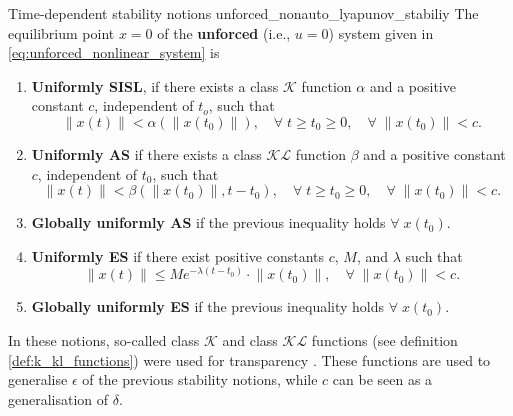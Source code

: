 \begin{definition}[list text=Time-dependent stability notions,after pre=\footnotetext{Definition 4.2 of \cite{khalilNonlinearControl2015} was slightly changed for consistency with earlier stability notions.}]{Time-dependent stability notions \cite{khalilNonlinearControl2015}\footnotemark}{unforced_nonauto_lyapunov_stabiliy}
  The equilibrium point $x = 0$ of the \textbf{unforced} (i.e., $u=0$) system given in \eqref{eq:unforced_nonlinear_system} is
  \begin{enumerate}
    \item \textbf{Uniformly SISL}, if there exists a class $\mathcal{K}$ function $\alpha$ and a positive constant $c$, independent of $t_o$, such that
          \begin{equation}
            \left\|x\left(t\right)\right\| < \alpha \left( \left\|x \left( t_0 \right) \right\|\right), \quad \forall \; t \geq t_0 \geq 0, \quad \forall \; \left\|x\left(t_0 \right) \right\| < c.
          \end{equation}
    \item \textbf{Uniformly AS} if there exists a class $\mathcal{KL}$ function $\beta$ and a positive constant $c$, independent of $t_0$, such that
          \begin{equation}
            \left\|x\left(t\right)\right\| < \beta \left( \left\|x \left( t_0 \right) \right\|, t-t_0\right), \quad \forall \; t \geq t_0 \geq 0, \quad \forall \; \left\|x\left(t_0 \right) \right\| < c.
          \end{equation}
    \item	\textbf{Globally uniformly AS} if the previous inequality holds $\forall \; x \left( t _ 0 \right)$.
    \item	\textbf{Uniformly ES} if there exist positive constants $c$, $M$, and $\lambda$ such that
          \begin{equation}
            \left\|x\left(t \right) \right\| \leq Me^{-\lambda\left(t-t_0\right)} \cdot \left\|x\left(t_0 \right) \right\|, \quad \forall \; \left\|x\left(t_0 \right) \right\| < c.
          \end{equation}
    \item \textbf{Globally uniformly ES} if the previous inequality holds $\forall \; x \left( t _ 0 \right)$.
  \end{enumerate}
\end{definition}

In these notions, so-called class $\mathcal{K}$ and class $\mathcal{KL}$ functions (see definition \ref{def:k_kl_functions}) were used for transparency \cite{khalilNonlinearSystems2002}. These functions are used to generalise $\epsilon$ of the previous stability notions, while $c$ can be seen as a generalisation of $\delta$.

